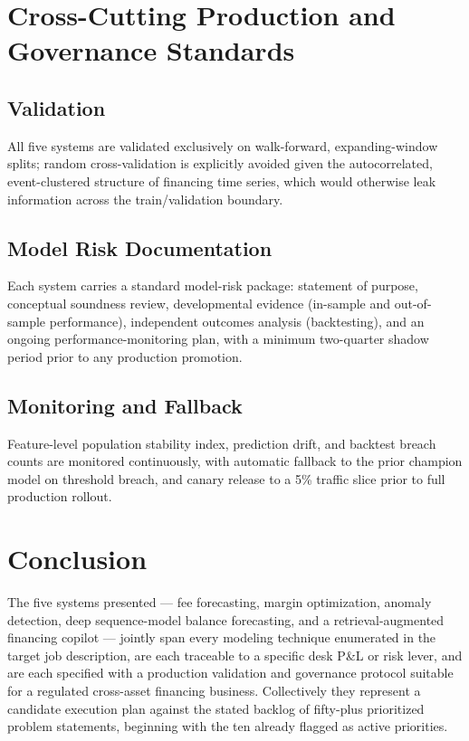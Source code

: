 \documentclass[11pt]{report}
\begin{document}
\chapter{Cross-Cutting Production and Governance Standards}

\section{Validation}
All five systems are validated exclusively on walk-forward, expanding-window splits; random
cross-validation is explicitly avoided given the autocorrelated, event-clustered structure of
financing time series, which would otherwise leak information across the train/validation boundary.

\section{Model Risk Documentation}
Each system carries a standard model-risk package: statement of purpose, conceptual soundness review,
developmental evidence (in-sample and out-of-sample performance), independent outcomes analysis
(backtesting), and an ongoing performance-monitoring plan, with a minimum two-quarter shadow period
prior to any production promotion.

\section{Monitoring and Fallback}
Feature-level population stability index, prediction drift, and backtest breach counts are monitored
continuously, with automatic fallback to the prior champion model on threshold breach, and canary
release to a 5\% traffic slice prior to full production rollout.

\chapter{Conclusion}
The five systems presented — fee forecasting, margin optimization, anomaly detection, deep
sequence-model balance forecasting, and a retrieval-augmented financing copilot — jointly span every
modeling technique enumerated in the target job description, are each traceable to a specific desk
P\&L or risk lever, and are each specified with a production validation and governance protocol
suitable for a regulated cross-asset financing business. Collectively they represent a candidate
execution plan against the stated backlog of fifty-plus prioritized problem statements, beginning with
the ten already flagged as active priorities.
\end{document}
